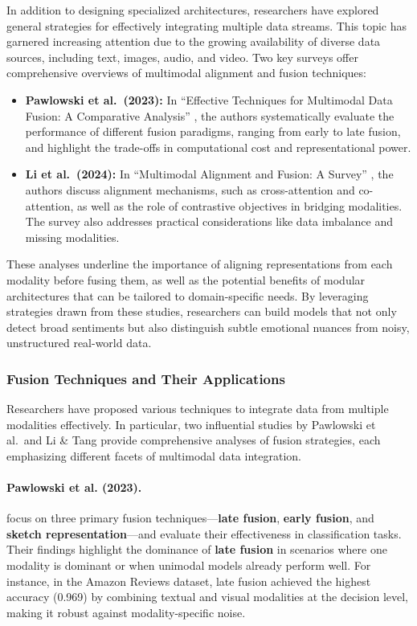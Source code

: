 In addition to designing specialized architectures, researchers have explored general strategies for effectively integrating multiple data streams. This topic has garnered increasing attention due to the growing availability of diverse data sources, including text, images, audio, and video. Two key surveys offer comprehensive overviews of multimodal alignment and fusion techniques:

\begin{itemize}
    \item \textbf{Pawlowski et al.\ (2023):} In ``Effective Techniques for Multimodal Data Fusion: A Comparative Analysis'' \cite{pawlowski_effective_2023}, the authors systematically evaluate the performance of different fusion paradigms, ranging from early to late fusion, and highlight the trade-offs in computational cost and representational power.
    \item \textbf{Li et al.\ (2024):} In ``Multimodal Alignment and Fusion: A Survey'' \cite{li_multimodal_2024}, the authors discuss alignment mechanisms, such as cross-attention and co-attention, as well as the role of contrastive objectives in bridging modalities. The survey also addresses practical considerations like data imbalance and missing modalities.
\end{itemize}

These analyses underline the importance of aligning representations from each modality before fusing them, as well as the potential benefits of modular architectures that can be tailored to domain-specific needs. By leveraging strategies drawn from these studies, researchers can build models that not only detect broad sentiments but also distinguish subtle emotional nuances from noisy, unstructured real-world data.


\subsubsection{Fusion Techniques and Their Applications}
Researchers have proposed various techniques to integrate data from multiple modalities effectively. In particular, two influential studies by Pawlowski et al.\ and Li \& Tang provide comprehensive analyses of fusion strategies, each emphasizing different facets of multimodal data integration.

\paragraph{Pawlowski et al. (2023).}
focus on three primary fusion techniques—\textbf{late fusion}, \textbf{early fusion}, and \textbf{sketch representation}—and evaluate their effectiveness in classification tasks. Their findings highlight the dominance of \textbf{late fusion} in scenarios where one modality is dominant or when unimodal models already perform well. For instance, in the Amazon Reviews dataset, late fusion achieved the highest accuracy (0.969) by combining textual and visual modalities at the decision level, making it robust against modality-specific noise.
\newline

